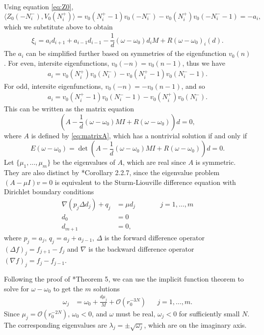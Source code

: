 \documentclass[12pt]{article}
\begin{document}
Using equation \cref{eq:Z0},
\[
\langle Z_0(-N_i^-), V_0(N_i^+) \rangle 
= v_0(N_i^+ - 1)v_0(-N_i^-) - v_0(N_i^+)v_0(-N_i^- - 1) = -a_i,
\]
which we substitute above to obtain
\begin{align}\label{eq:xifinal}
\xi_i = a_i d_{i+1}
+ a_{i-1} d_{i-1}
- \dfrac{1}{d} (\omega - \omega_0) d_i M 
+ R(\omega - \omega_0)_i(d).
\end{align}
The $a_i$ can be simplified further based on symmetries of the eigenfunction $v_0(n)$. For even, intersite eigenfunctions, $v_0(-n) = v_0(n-1)$, thus we have
\begin{align}\label{eq:aievenintersite}
a_i = v_0(N_i^+)v_0(N_i^-) - v_0(N_i^+ - 1)v_0(N_i^- -1).
\end{align}
For odd, intersite eigenfunctions, $v_0(-n) = -v_0(n-1)$, and so
\begin{align}\label{eq:aioddintersite}
	a_i = v_0(N_i^+ - 1)v_0(N_i^- -1) - v_0(N_i^+)v_0(N_i^-).
\end{align}
This can be written as the matrix equation
\begin{equation}\label{eq:matrixAeq}
	\left( A - \frac{1}{d}(\omega - \omega_0)MI + R(\omega-\omega_0)\right)d = 0,
\end{equation}
where $A$ is defined by \cref{eq:matrixA}, which has a nontrivial solution if and only if
\begin{equation}\label{eq:matrixdeteq}
	E(\omega - \omega_0) = 
	\det \left( A - \frac{1}{d}(\omega - \omega_0)MI + R(\omega-\omega_0)\right)d = 0.
\end{equation}
Let $\{ \mu_1, \dots, \mu_{m} \}$ be the eigenvalues of $A$, which are real since $A$ is symmetric. They are also distinct by \cite{Jirari1995}*{Corollary 2.2.7}, since the eigenvalue problem $(A - \mu I) v = 0$ is equivalent to the Sturm-Liouville difference equation with Dirichlet boundary conditions
\begin{equation*}
\begin{aligned}
\nabla( p_j \Delta d_j ) + q_j &= \mu d_j && \qquad j = 1, \dots, m \\
d_0 &= 0 \\
d_{m+1} &= 0,
\end{aligned}
\end{equation*}
where $p_j = a_j$, $q_j = a_j + a_{j-1}$, $\Delta$ is the forward difference operator $(\Delta f)_j = f_{j+1} - f_j$ and $\nabla$ is the backward difference operator $(\nabla f)_j = f_j - f_{j-1}$. 

Following the proof of \cite{Parker2020}*{Theorem 5}, we can use the implicit function theorem to solve for $\omega - \omega_0$ to get the $m$ solutions
\begin{align*}
	\omega_j &= \omega_0 + \frac{d \mu_j}{M} + \mathcal{O}(r_0^{-3N}) && j = 1, \dots, m.
\end{align*}
Since $\mu_j = \mathcal{O}(r_0^{-2N})$, $\omega_0 < 0$, and $\omega$ must be real, $\omega_j < 0$ for sufficiently small $N$. The corresponding eigenvalues are $\lambda_j = \pm \sqrt{\omega_j}$, which are on the imaginary axis.



\end{document}
